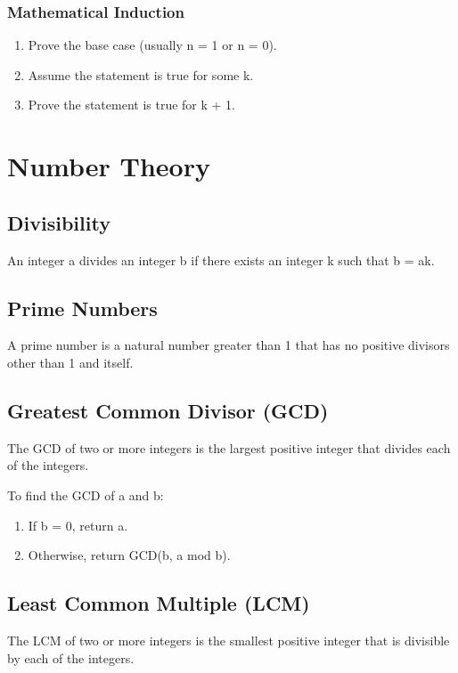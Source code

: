 \documentclass{article}
\begin{document}
\subsubsection{Mathematical Induction}
\begin{enumerate}
    \item Prove the base case (usually n = 1 or n = 0).
    \item Assume the statement is true for some k.
    \item Prove the statement is true for k + 1.
\end{enumerate}

\section{Number Theory}

\subsection{Divisibility}
An integer a divides an integer b if there exists an integer k such that b = ak.

\subsection{Prime Numbers}
A prime number is a natural number greater than 1 that has no positive divisors other than 1 and itself.

\subsection{Greatest Common Divisor (GCD)}
The GCD of two or more integers is the largest positive integer that divides each of the integers.

\begin{theorem}
To find the GCD of a and b:
\begin{enumerate}
    \item If b = 0, return a.
    \item Otherwise, return GCD(b, a mod b).
\end{enumerate}
\end{theorem}

\subsection{Least Common Multiple (LCM)}
The LCM of two or more integers is the smallest positive integer that is divisible by each of the integers.
\end{document}
